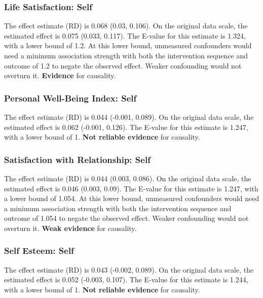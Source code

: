 \documentclass[
  singlecolumn]{article}
\begin{document}
\subsubsection{Life Satisfaction: Self}\label{life-satisfaction-self-1}

The effect estimate (RD) is 0.068 (0.03, 0.106). On the original data
scale, the estimated effect is 0.075 (0.033, 0.117). The E-value for
this estimate is 1.324, with a lower bound of 1.2. At this lower bound,
unmeasured confounders would need a minimum association strength with
both the intervention sequence and outcome of 1.2 to negate the observed
effect. Weaker confounding would not overturn it. \textbf{Evidence} for
causality.

\subsubsection{Personal Well-Being Index:
Self}\label{personal-well-being-index-self-1}

The effect estimate (RD) is 0.044 (-0.001, 0.089). On the original data
scale, the estimated effect is 0.062 (-0.001, 0.126). The E-value for
this estimate is 1.247, with a lower bound of 1. \textbf{Not reliable
evidence} for causality.

\subsubsection{Satisfaction with Relationship:
Self}\label{satisfaction-with-relationship-self-1}

The effect estimate (RD) is 0.044 (0.003, 0.086). On the original data
scale, the estimated effect is 0.046 (0.003, 0.09). The E-value for this
estimate is 1.247, with a lower bound of 1.054. At this lower bound,
unmeasured confounders would need a minimum association strength with
both the intervention sequence and outcome of 1.054 to negate the
observed effect. Weaker confounding would not overturn it. \textbf{Weak
evidence} for causality.

\subsubsection{Self Esteem: Self}\label{self-esteem-self-1}

The effect estimate (RD) is 0.043 (-0.002, 0.089). On the original data
scale, the estimated effect is 0.052 (-0.003, 0.107). The E-value for
this estimate is 1.244, with a lower bound of 1. \textbf{Not reliable
evidence} for causality.
\end{document}
